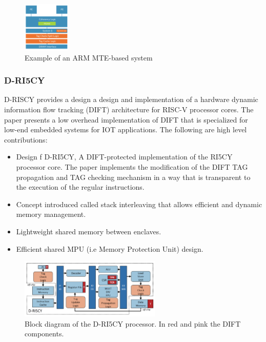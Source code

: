 \begin{figure}[htbp!] 
  \centering    
  \includegraphics[width=0.2\textwidth]{ARMMTE}
  \caption[MTE]{Example of an ARM MTE-based system \cite{ARMMTE}}
  \label{fig:MTE}
  \end{figure}

\subsubsection{D-RI5CY}
D-RISCY\cite{D-RISCY} provides a design a design and implementation of a hardware dynamic information flow 
tracking (DIFT) architecture for RISC-V processor cores. The paper presents a low 
overhead implementation of DIFT that is specialized for low-end embedded systems
for IOT applications. The following are high level contributions:
\begin{itemize}
  \item Design f D-RI5CY, A DIFT-protected implementation of the RI5CY processor core. 
        The paper implements the modification of the DIFT TAG propagation and TAG checking
        mechanism in a way that is transparent to the execution of the regular instructions. 
  \item Concept introduced called stack interleaving that allows efficient and dynamic memory management.
  \item Lightweight shared memory between enclaves.
  \item Efficient shared MPU (i.e Memory Protection Unit) design.
\end{itemize}

\begin{figure}[htbp!] 
  \centering    
  \includegraphics[width=0.6\textwidth]{D-RISCV}
  \caption[D-RISCY]{ Block diagram of the D-RI5CY processor. In red and pink the DIFT components. \cite{D-RISCY}}
  \label{fig:MTE}
  \end{figure}

